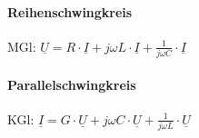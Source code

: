\documentclass[german]{article}
\begin{document}
\paragraph{Reihenschwingkreis}
MGl: $\underline{U} = R \cdot \underline{I} + j\omega L \cdot \underline{I} + \frac1{j\omega C} \cdot \underline{I}$

\paragraph{Parallelschwingkreis}
{}
KGl: $\underline{I} = G \cdot \underline{U} + j\omega C \cdot \underline{U} + \frac1{j\omega L} \cdot \underline{U}$
\end{document}
